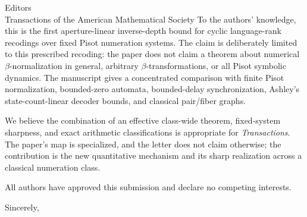 \documentclass[11pt]{letter}
\begin{document}
\begin{letter}{Editors\\Transactions of the American Mathematical Society}
To the authors' knowledge, this is the first aperture-linear inverse-depth
bound for cyclic language-rank recodings over fixed Pisot numeration systems.
The claim is deliberately limited to this prescribed recoding: the paper does
not claim a theorem about numerical $\beta$-normalization in general,
arbitrary $\beta$-transformations, or all Pisot symbolic dynamics.  The
manuscript gives a concentrated comparison with finite Pisot normalization,
bounded-zero automata, bounded-delay synchronization, Ashley's
state-count-linear decoder bounds, and classical pair/fiber graphs.

We believe the combination of an effective class-wide theorem, fixed-system
sharpness, and exact arithmetic classifications is appropriate for
\textit{Transactions}.  The paper's map is specialized, and the letter does
not claim otherwise; the contribution is the new quantitative mechanism and
its sharp realization across a classical numeration class.

All authors have approved this submission and declare no competing interests.

\closing{Sincerely,}

\end{letter}
\end{document}
